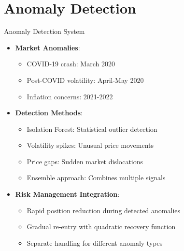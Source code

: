\documentclass[aspectratio=169,xcolor=dvipsnames]{beamer}
\begin{document}
\section{Anomaly Detection}
\begin{frame}{Anomaly Detection System}
	\begin{itemize}
		\item \textbf{Market Anomalies}:
		      \begin{itemize}
			      \item COVID-19 crash: March 2020
			      \item Post-COVID volatility: April-May 2020
			      \item Inflation concerns: 2021-2022
		      \end{itemize}
		\item \textbf{Detection Methods}:
		      \begin{itemize}
			      \item Isolation Forest: Statistical outlier detection
			      \item Volatility spikes: Unusual price movements
			      \item Price gaps: Sudden market dislocations
			      \item Ensemble approach: Combines multiple signals
		      \end{itemize}
		\item \textbf{Risk Management Integration}:
		      \begin{itemize}
			      \item Rapid position reduction during detected anomalies
			      \item Gradual re-entry with quadratic recovery function
			      \item Separate handling for different anomaly types
		      \end{itemize}
	\end{itemize}
\end{frame}
\end{document}
